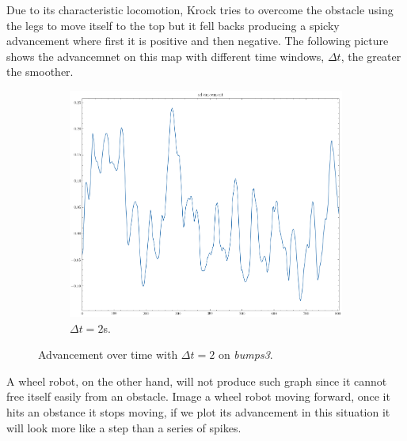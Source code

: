 \documentclass[../document.tex]{subfiles}
\begin{document}
Due to its characteristic locomotion, Krock tries to overcome the obstacle using the legs to move itself to the top but it fell backs producing a spicky advancement where first it is positive and then negative. The following picture shows the advancemnet on this map with different time windows, $\Delta t$, the greater the smoother.

\begin{figure}[H]
    \centering
    \begin{subfigure}[b]{0.45\textwidth}
        \includegraphics[width=\linewidth]{../img/3/find_tr/100-bumps3}
        \caption{$\Delta t = 2$s.}
    \end{subfigure}

\caption{Advancement over time with  $\Delta t = 2$ on \emph{bumps3}.}
\end{figure}
A wheel robot, on the other hand, will not produce such graph since it cannot free itself easily from an obstacle. Image a wheel robot moving forward, once it hits an obstance it stops moving, if we plot its advancement in this situation it will look more like a step than a series of spikes.
\end{document}
